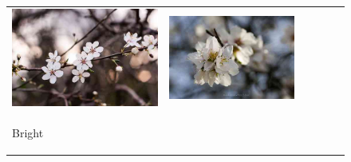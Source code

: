 \begin{figure}
\begin{minipage}[t]{\textwidth}
\begin{tabular}{m{.01\linewidth} m{.16\linewidth} m{.16\linewidth} m{.16\linewidth} m{.16\linewidth} m{.16\linewidth}}
    \includegraphics[width=\linewidth]{../style/figures/flickr_on_flickr/pred_style_Bokeh/3.jpg} &
    \includegraphics[width=\linewidth]{../style/figures/flickr_on_flickr/pred_style_Bokeh/4.jpg} \\
    \begin{turn}{90}\small{Bright}\end{turn} &

\end{tabular}
\end{minipage}
\end{figure}
